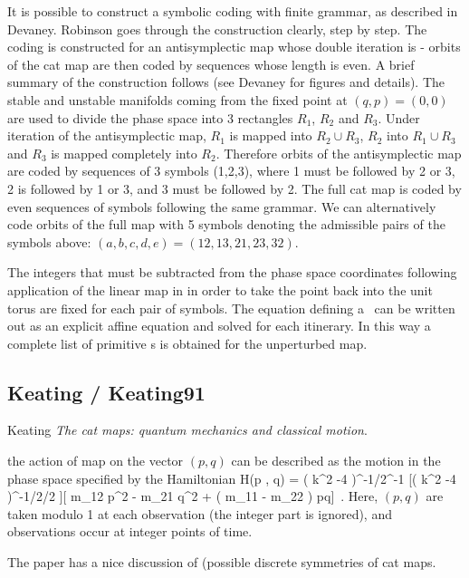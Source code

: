 It is possible to construct a symbolic coding
with finite grammar, as described in Devaney.
Robinson goes through the construction clearly, step by step.
The coding is constructed for an antisymplectic
map whose double iteration is  - orbits of the cat
map are then coded by sequences whose length is even. A
brief summary of the construction follows (see Devaney for
figures and details). The stable and unstable manifolds coming
from the fixed point at $(q,p) = (0,0)$ are used to divide
the phase space into 3 rectangles $R_1$, $R_2$ and $R_3$. Under iteration
of the antisymplectic map, $R_1$ is mapped into $R_2 \cup R_3$, $R_2$
into $R_1 \cup R_3$ and $R_3$ is mapped completely into $R_2$. Therefore
orbits of the antisymplectic map are coded by sequences
of 3 symbols (1,2,3), where 1 must be followed by 2 or 3, 2
is followed by 1 or 3, and 3 must be followed by 2. The full
cat map is coded by even sequences of symbols following
the same grammar. We can alternatively code orbits of the
full map with 5 symbols denoting the admissible pairs of the
symbols above: $(a,b,c,d,e) = (12,13,21,23,32)$.


The integers that must be subtracted from the phase
space coordinates following application of the linear map in
 in order to take the point back into the unit torus are
fixed for each pair of symbols.
The equation
defining a \po\ can be written out as an
explicit affine equation and solved for each itinerary.
In this way a complete list of primitive {\po s} is obtained for the unperturbed map.


\subsection{Keating / Keating91}
\label{sect:Keating91}

Keating
{\em The cat maps: quantum mechanics and classical motion}.

the action of map on the vector $( p, q)$ can be described as  the
motion  in  the  phase  space  specified  by  the
Hamiltonian
\beq
H(p , q) = ( k^2 -4 )^{-1/2}\sinh^{-1} [( k^2 -4 )^{-1/2}/2 ][ m_{12} p^2 -
m_{21} q^2 + ( m_{11} - m_{22} ) pq]
\,.
Here, $( p, q)$ are taken modulo 1 at each observation (the integer part
is ignored), and observations occur at integer points of time.

The paper has a nice discussion of (possible discrete symmetries of
cat maps.

